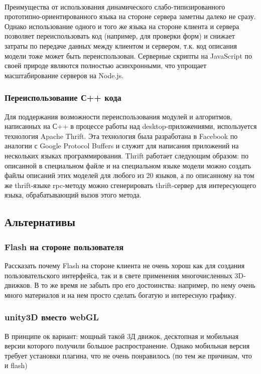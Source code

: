 \documentclass[12pt, a4paper]{article}
\begin{document}
\\
Преимущества от использования динамического слабо-типизированного
прототипно-ориентированного языка на стороне сервера заметны далеко не сразу.
Однако использование одного и того же языка на стороне клиента и сервера
позволяет переиспользовать код (например, для проверки форм) и снижает затраты
по передаче данных между клиентом и сервером, т.к. код описания модели тоже может
быть переиспользован. Серверные скрипты на JavaScript по своей природе являются
полностью асинхронными, что упрощает масштабирование серверов на Node.js.

\subsubsection{Переиспользование С++ кода}
Для поддержания возможности переиспользования модулей и алгоритмов, написанных
на С++ в процессе работы над desktop-приложениями, используется технология
Apache Thrift. Эта технология была разработана в Facebook по аналогии с Google
Protocol Buffers и служит для написания приложений на нескольких языках
программирования. Thrift работает следующим образом: по описанной в специальном
файле и на специальном языке модели можно создать файлы описаний этих моделей
для любого из 20 языков, а по описанному на том же thrift-языке rpc-методу можно
сгенерировать thrift-сервер для интересующего языка, обрабатывающий вызов этого
метода.

\subsection{Альтернативы}
\subsubsection{Flash на стороне пользователя}
Рассказать почему Flash на стороне клиента не очень хорош как для создания
пользовательского интерфейса, так и в свете применения многочисленных
3D-движков. В то же время не забыть про его достоинства: например, по нему очень
много материалов и на нем просто сделать богатую и интересную графику.
\subsubsection{unity3D вместо webGL}
В принципе ок вариант: мощный такой 3Д движок, десктопная и мобильная версии
которого получили большое распространение. Однако мобильная версия требует
установки плагина, что не очень понравилось (по тем же причинам, что и flash)
\end{document}
